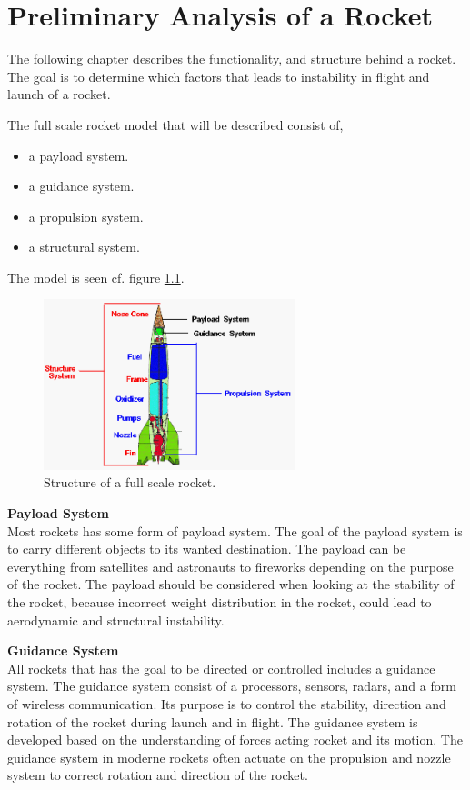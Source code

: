 \chapter{Preliminary Analysis of a Rocket}
The following chapter describes the functionality,  and structure behind a rocket. The goal is to determine which factors that leads to instability in flight and launch of a rocket. 



The full scale rocket model that will be described consist of,
\begin{itemize}[noitemsep]
\item a payload system.
\item a guidance system.
\item a propulsion system. 
\item a structural system.
\end{itemize}    
The model is seen cf. figure \ref{fig:RocketStructure}.
\begin{figure}[htbp]
	\centering
 	\includegraphics[width=0.65\textwidth]{figures/RocketStructure.png} 
 	\caption{Structure of a full scale rocket\cite{web:RocketStructure}.}
 	\label{fig:RocketStructure}
\end{figure}

\textbf{Payload System}\\
Most rockets has some form of payload system. The goal of the payload system is to carry different objects to its wanted destination. The payload can be everything from satellites and astronauts to fireworks depending on the purpose of the rocket. The payload should be considered when looking at the stability of the rocket, because incorrect weight distribution in the rocket, could lead to aerodynamic and structural instability. 


\textbf{Guidance System}\\
All rockets that has the goal to be directed or controlled includes a guidance system. The guidance system consist of a processors, sensors, radars, and  a form of wireless communication. Its purpose is to control the stability, direction and rotation of the rocket during launch and in flight. The guidance system is developed based on the understanding of forces acting rocket and its motion. The guidance system in moderne rockets often actuate on the propulsion and nozzle system to correct rotation and direction of the rocket.

